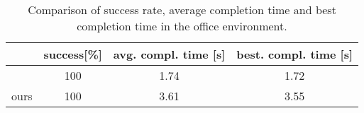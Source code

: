 \begin{table}[t]
\centering
\caption{Comparison of success rate, average completion time and best completion time in the office environment.}
                \begin{tabular}{c|c|c|c} 
                 \hline 
                  & success[\%] & avg. compl. time [s] & best. compl. time [s] \\ [0.1ex]
                  \hline
                  \hline
                 \cite{Penicka_2022} & 100 & 1.74 & 1.72 \\ [0.1ex] 
                 ours & 100 & 3.61 & 3.55 \\ [0.1ex] 
                 \hline
                 \end{tabular}
\label{table:compare}
\end{table}